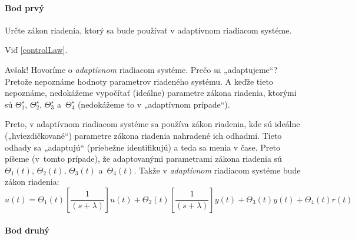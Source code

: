 \documentclass[a4paper, 10pt, ]{article}
\begin{document}
\paragraph{Bod prvý}

\smallskip

{\color{gray}

Určte zákon riadenia, ktorý sa bude používať v adaptívnom riadiacom systéme.

}

\smallskip

\noindent
Viď \eqref{controlLaw}.

Avšak! Hovoríme o \emph{adaptívnom} riadiacom systéme. Prečo sa „adaptujeme“? Pretože nepoznáme hodnoty parametrov riadeného systému. A keďže tieto nepoznáme, nedokážeme vypočítať (ideálne) parametre zákona riadenia, ktorými sú $\Theta_1^\star$, $\Theta_2^\star$, $\Theta_3^\star$ a~$\Theta_4^\star$ (nedokážeme to v „adaptívnom prípade“).

Preto, v adaptívnom riadiacom systéme sa používa zákon riadenia, kde sú ideálne („hviezdičkované“) parametre zákona riadenia nahradené ich odhadmi. Tieto odhady sa „adaptujú“ (priebežne identifikujú) a teda sa menia v čase. Preto píšeme (v~tomto prípade), že adaptovanými parametrami zákona riadenia sú $\Theta_1(t)$, $\Theta_2(t)$, $\Theta_3(t)$ a~$\Theta_4(t)$. Takže v \emph{adaptívnom} riadiacom systéme bude zákon riadenia:
\begin{equation} \label{controlLawAdapt}
	u(t) = \Theta_1(t) \left[ \frac{1}{(s + \lambda)} \right] u(t) + \Theta_2(t) \left[ \frac{1}{(s + \lambda)} \right] y(t) + \Theta_3(t) y(t) + \Theta_4(t) r(t)
\end{equation}











\paragraph{Bod druhý}

\smallskip
\end{document}
